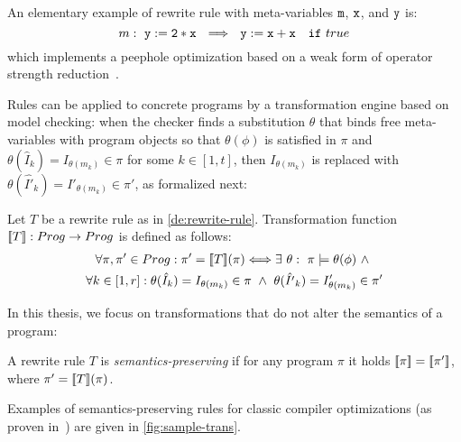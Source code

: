 \noindent An elementary example of rewrite rule with meta-variables $\text{${\tt m}$}$, $\text{${\tt x}$}$, and $\text{${\tt y}$}$ is: $$m: ~ {\tt y:=2*x} ~~ \Longrightarrow ~~ {\tt y:=x+x} ~~~ {\tt if} ~ true$$ which implements a peephole optimization based on a weak form of operator strength reduction~\cite{Cooper01}.

Rules can be applied to concrete programs by a transformation engine based on model checking: when the checker finds a substitution $\theta$ that binds free meta-variables with program objects so that $\theta(\phi)$ is satisfied in $\pi$ and $\theta(\hat{I}_k)=I_{\theta(m_k)}\in \pi$ for some $k\in[1,t]$, then $I_{\theta(m_k)}$ is replaced with $\theta(\hat{I'}_k)=I'_{\theta(m_k)}\in \pi'$, as formalized next:

\begin{definition}
\label{de:trans-func}
Let $T$ be a rewrite rule as in \ref{de:rewrite-rule}. Transformation function $[\![T]\!]: Prog\rightarrow Prog$ is defined as follows:
\vspace{-2mm}
\begin{multline*}
\forall \pi, \pi'\in Prog: \pi'=[\![T]\!](\pi) \Longleftrightarrow
\exists ~ \theta: ~ \pi\models \theta(\phi) ~ \wedge ~ \\
\forall k\in[1,r]: \theta(\hat{I}_k)=I_{\theta(m_k)}\in \pi ~ \wedge ~ \theta(\hat{I'}_k)=I'_{\theta(m_k)}\in \pi'
\end{multline*}
\end{definition}

\noindent In this thesis, we focus on transformations that do not alter the semantics of a program:

\begin{definition}
\label{de:sound-trans}
A rewrite rule $T$ is {\em semantics-preserving} if for any program $\pi$ it holds $[\![\pi]\!]=[\![\pi']\!]$, where $\pi'=[\![T]\!](\pi)$.
\end{definition}

\noindent Examples of semantics-preserving rules for classic compiler optimizations (as proven in~\cite{Lacey02,Lacey04}) are given in \myfigure\ref{fig:sample-trans}.

